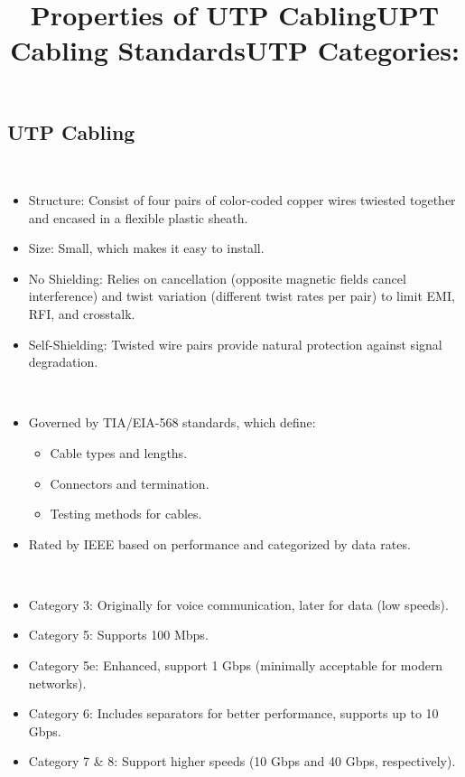 \documentclass[a4paper,11pt]{article}
\begin{document}
\subsection{UTP Cabling}
\title{Properties of UTP Cabling}\\
\begin{itemize}
    \item Structure: Consist of four pairs of color-coded copper wires twiested together and encased in a flexible plastic sheath.\\
    \item Size: Small, which makes it easy to install.\\
    \item No Shielding: Relies on cancellation (opposite magnetic fields cancel interference) and twist variation (different twist rates per pair) to limit EMI, RFI, and crosstalk.\\
    \item Self-Shielding: Twisted wire pairs provide natural protection against signal degradation.\\
\end{itemize}

\title{UPT Cabling Standards}\\
\begin{itemize}
    \item Governed by TIA/EIA-568 standards, which define:\\
    \begin{itemize}
        \item Cable types and lengths.\\
        \item Connectors and termination.\\
        \item Testing methods for cables.\\
    \end{itemize}
    \item Rated by IEEE based on performance and categorized by data rates.\\
\end{itemize}

\title{UTP Categories:}\\
\begin{itemize}
    \item Category 3: Originally for voice communication, later for data (low speeds).\\
    \item Category 5: Supports 100 Mbps.\\
    \item Category 5e: Enhanced, support 1 Gbps (minimally acceptable for modern networks).\\
    \item Category 6: Includes separators for better performance, supports up to 10 Gbps.\\
    \item Category 7 \& 8: Support higher speeds (10 Gbps and 40 Gbps, respectively).\\
\end{itemize}
\end{document}
